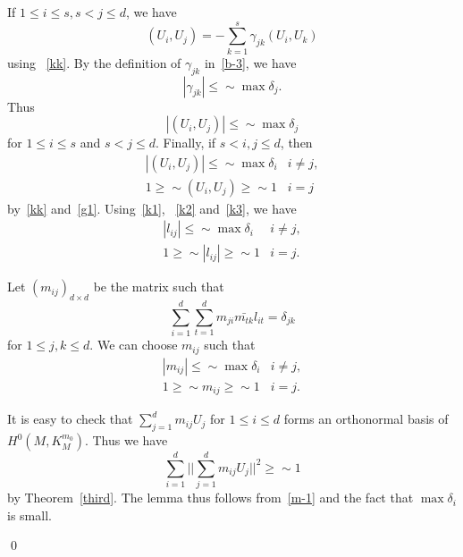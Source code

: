 If $1\leq i\leq s, s<j\leq d$, we have
\[
(U_i, U_j)=-\sum_{k=1}^s\gamma_{jk} (U_i, U_k)
\]
using ~\eqref{kk}.
By the definition of $\gamma_{jk}$ in~\eqref{b-3}, we have
\begin{equation}\label{g1}
|\gamma_{jk}|\leq\sim\max\delta_j.
\end{equation}
Thus
\begin{equation}\label{k2}
|(U_i, U_j)|\leq\sim\max\delta_j
\end{equation}
for $1\leq i\leq s$ and $s<j\leq d$.
Finally, if $s<i,j\leq d$, then 
\begin{equation}\label{k3}
\begin{array}{ll}
|(U_i, U_j)|\leq\sim \max\delta_i & i\neq j,\\
1\geq\sim (U_i, U_j)\geq\sim 1 & i=j
\end{array}
\end{equation}
by~\eqref{kk} and~\eqref{g1}.
Using~\eqref{k1}, ~\eqref{k2} and~\eqref{k3}, we have
\[
\begin{array}{ll}
|l_{ij}|\leq\sim \max \delta_i & i\neq j,\\
1\geq\sim |l_{ij}|\geq\sim 1 & i=j.
\end{array}
\]

Let $(m_{ij})_{d\times d}$ be the matrix such that
\[
\sum_{i=1}^d\sum_{t=1}^d m_{ji}\bar{m_{tk}}l_{it}=\delta_{jk}
\]
for $1\leq j,k\leq d$. We can choose $m_{ij}$ such that
\begin{equation}\label{m-1}
\begin{array}{ll}
|m_{ij}|\leq\sim \max
\delta_i & i\neq j,\\
1\geq\sim m_{ij}\geq\sim 1 & i=j.
\end{array}
\end{equation}

It is easy to check that
$\sum_{j=1}^d m_{ij} U_j$ for $1\leq i\leq d$ forms an orthonormal basis
of $H^0(M, K_M^{m_0})$.
Thus we have
\[
\sum_{i=1}^d||\sum_{j=1}^dm_{ij}U_j||^2\geq\sim 1
\]
by Theorem~\ref{third}.
The lemma thus follows from~\eqref{m-1} and the fact that $\max \delta_i$
is
small.

\qed




